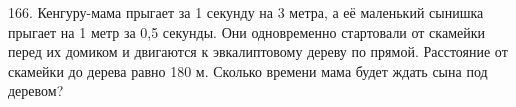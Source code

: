 166. Кенгуру-мама прыгает за 1 секунду на 3 метра, а её маленький сынишка прыгает на 1 метр за 0,5 секунды. Они одновременно стартовали от скамейки перед их домиком и двигаются к эвкалиптовому дереву по прямой. Расстояние от скамейки до дерева равно 180 м. Сколько времени мама будет ждать сына под деревом?\\

